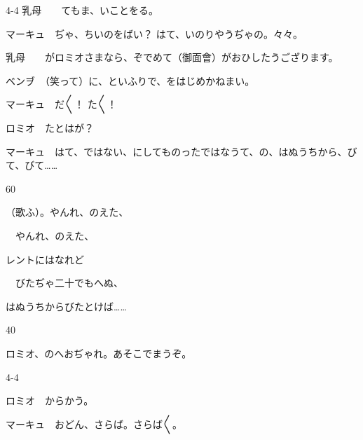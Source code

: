 \documentclass[tate,paper=b6j,jafontsize=9pt]{jlreq}
\begin{document}
\begin{azconvIndented}{4\zw}{-4\zw}
乳母　　てもま、いことをる。

マーキュ　ぢゃ、ちいのをばい？ はて、いのりやうぢゃの。々々。

乳母　　がロミオさまなら、ぞでめて（御面會）がおひしたうござります。

ベンヺ　（笑って）に、といふりで、をはじめかねまい。

マーキュ　だ{〳〵}！ た{〳〵}！

ロミオ　たとはが？

マーキュ　はて、ではない、にしてものったではなうて、の、はぬうちから、びて、びて……

\end{azconvIndented}
\begin{azconvIndented}{6\zw}{0\zw}

（歌ふ）。やんれ、のえた、

　やんれ、のえた、

レントにはなれど

　びたぢゃ二十でもへぬ、

はぬうちからびたとけば……

\end{azconvIndented}
\begin{azconvIndented}{4\zw}{0\zw}

ロミオ、のへおぢゃれ。あそこでまうぞ。

\end{azconvIndented}
\begin{azconvIndented}{4\zw}{-4\zw}

ロミオ　からかう。

マーキュ　おどん、さらば。さらば{〳〵}。

\end{azconvIndented}
\end{document}
